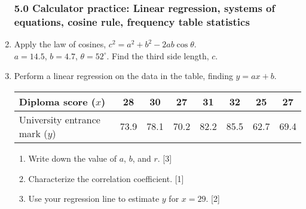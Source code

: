 \documentclass[12pt, twoside]{article}
\begin{document}
\begin{enumerate}
    \subsubsection*{5.0 Calculator practice: Linear regression, systems of equations, cosine rule, frequency table statistics}

    \item Apply the law of cosines, $c^2=a^2+b^2-2ab \cos \theta$. \\[0.25cm]
    $a=14.5$, $b=4.7$, $\theta = 52^\circ$. Find the third side length, $c$.

    \item Perform a linear regression on the data in the table, finding $y=ax+b$. 
            \begin{center}
            \begin{tabular}{|l|c|c|c|c|c|c|c|}
                \hline
                Diploma score ($x$) & 28 & 30 & 27 & 31 & 32 & 25 & 27 \\ 
                \hline 
                University entrance mark ($y$) & 73.9 & 78.1 & 70.2 & 82.2 & 85.5 & 62.7 & 69.4 \\ 
                \hline 
                \end{tabular}
            \end{center}
            \begin{enumerate}
                \item Write down the value of $a$, $b$, and $r$. \hfill [3]\\[0.25cm]
                \item Characterize the correlation coefficient. \hfill [1]\\[0.25cm]
                \item Use your regression line to estimate $y$ for $x=29$. \hfill [2]
            \end{enumerate}


\end{enumerate}
\end{document}
